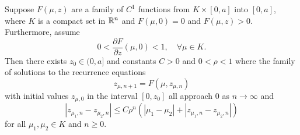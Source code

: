 \begin{lem}
	Suppose \(F(\mu, z)\) are a family of \(C^1\) functions from \(K \times [0,a]\) into \([0,a]\), where \(K\) is a compact set in \(\mathbb{R}^n\) and \(F(\mu, 0) = 0\) and \(F(\mu, z) > 0\). Furthermore, assume
	\begin{equation}
		0< \frac{\partial F}{\partial z} (\mu , 0) < 1, \quad \forall \mu \in K.
	\end{equation}
	Then there exists \(z_0 \in (0,a]\) and constants \(C> 0\) and \(0<\rho< 1\) where the family of solutions to the recurrence equations
	\begin{equation}
		z_{\mu, n+1} = F(\mu, z_{\mu, n})
	\end{equation}
	with initial values \(z_{\mu, 0}\) in the interval \([0,z_0]\) all approach \(0\) as \(n\to \infty\) and
	\begin{equation}
		|z_{\mu_1,n} - z_{\mu_2,n} | \leq C \rho^n( |\mu_1- \mu_2| + |z_{\mu_1,n} - z_{\mu_2,n}|)
	\end{equation}
	for all \(\mu_1,\mu_2 \in K\) and \(n\geq 0\).
\end{lem}

